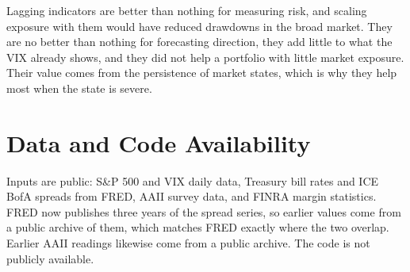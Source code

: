 \documentclass[10pt,twocolumn,letterpaper]{article}
\begin{document}
Lagging indicators are better than nothing for measuring risk, and scaling exposure with them would have reduced drawdowns in the broad market. They are no better than nothing for forecasting direction, they add little to what the VIX already shows, and they did not help a portfolio with little market exposure. Their value comes from the persistence of market states, which is why they help most when the state is severe.

\section*{Data and Code Availability}

Inputs are public: S\&P 500 and VIX daily data, Treasury bill rates and ICE BofA spreads from FRED, AAII survey data, and FINRA margin statistics. FRED now publishes three years of the spread series, so earlier values come from a public archive of them, which matches FRED exactly where the two overlap. Earlier AAII readings likewise come from a public archive. The code is not publicly available.

\vspace{4pt}
\end{document}
